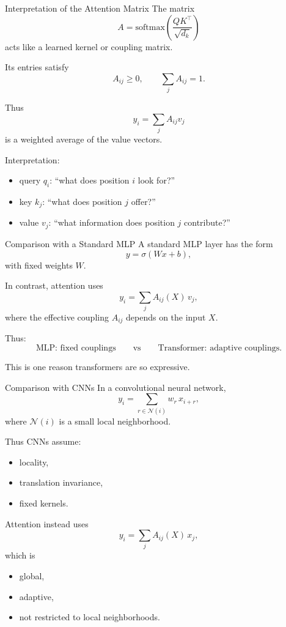 \documentclass{beamer}
\begin{document}
\begin{frame}{Interpretation of the Attention Matrix}
  The matrix
  \[
  A = \mathrm{softmax}\!\left(\frac{QK^\top}{\sqrt{d_k}}\right)
  \]
  acts like a learned kernel or coupling matrix.

  Its entries satisfy
  \[
  A_{ij} \ge 0,
  \qquad
  \sum_j A_{ij}=1.
  \]

  Thus
  \[
  y_i = \sum_j A_{ij} v_j
  \]
  is a weighted average of the value vectors.

  Interpretation:
  \begin{itemize}
  \item query \(q_i\): ``what does position \(i\) look for?''
  \item key \(k_j\): ``what does position \(j\) offer?''
  \item value \(v_j\): ``what information does position \(j\) contribute?''
  \end{itemize}
\end{frame}

\begin{frame}{Comparison with a Standard MLP}
  A standard MLP layer has the form
  \[
  y = \sigma(Wx + b),
  \]
  with fixed weights \(W\).

  In contrast, attention uses
  \[
  y_i = \sum_j A_{ij}(X)\, v_j,
  \]
  where the effective coupling \(A_{ij}\) depends on the input \(X\).

  Thus:
  \[
  \text{MLP: fixed couplings}
  \qquad\text{vs}\qquad
  \text{Transformer: adaptive couplings}.
  \]

  This is one reason transformers are so expressive.
\end{frame}

\begin{frame}{Comparison with CNNs}
  In a convolutional neural network,
  \[
  y_i = \sum_{r \in \mathcal{N}(i)} w_r\, x_{i+r},
  \]
  where \(\mathcal{N}(i)\) is a small local neighborhood.

  Thus CNNs assume:
  \begin{itemize}
  \item locality,
  \item translation invariance,
  \item fixed kernels.
  \end{itemize}

  Attention instead uses
  \[
  y_i = \sum_j A_{ij}(X)\, x_j,
  \]
  which is
  \begin{itemize}
  \item global,
  \item adaptive,
  \item not restricted to local neighborhoods.
  \end{itemize}
\end{frame}
\end{document}
